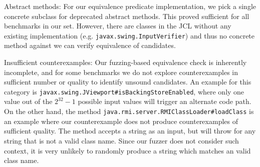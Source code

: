 \documentclass[sigconf,review,anonymous]{acmart}
\begin{document}
Abstract methods: For our equivalence predicate implementation, we pick a single
concrete subclass for deprecated abstract methods. This proved sufficient for
all benchmarks in our set. However, there are classes in the JCL without any
existing implementation (e.g. \lstinline{javax.swing.InputVerifier}) and thus no concrete
method against we can verify equivalence of candidates.

Insufficient counterexamples: Our fuzzing-based equivalence check is inherently
incomplete, and for some benchmarks we do not explore counterexamples in
sufficient number or quality to identify unsound candidates. An example for this
category is \lstinline{javax.swing.JViewport#isBackingStoreEnabled}, where only one value
out of the $2^32-1$ possible input values will trigger an alternate code path.
On the other hand, the method \lstinline{java.rmi.server.RMIClassLoader#loadClass} is an
example where our counterexample does not produce counterexamples of sufficient
quality. The method accepts a string as an input, but will throw for any string
that is not a valid class name. Since our fuzzer does not consider such context,
it is very unlikely to randomly produce a string which matches an valid class
name.

%
%
%
%
\end{document}
